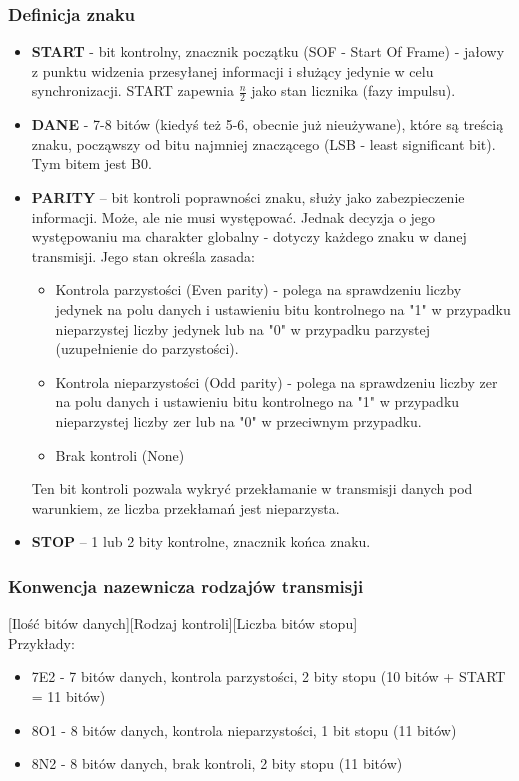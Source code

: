 		\subsubsection{Definicja znaku}
		\begin{itemize}
			\item \textbf{START} - bit kontrolny, znacznik początku (SOF - Start Of Frame) - jałowy z punktu widzenia przesyłanej informacji i służący jedynie w celu synchronizacji. START zapewnia $\frac{n}{2}$ jako stan licznika (fazy impulsu).
			\item \textbf{DANE} - 7-8 bitów (kiedyś też 5-6, obecnie już nieużywane), które są treścią znaku, począwszy od bitu najmniej znaczącego (LSB - least significant bit). Tym bitem jest B0.
			\item \textbf{PARITY} – bit kontroli poprawności znaku, służy jako zabezpieczenie informacji. Może, ale nie musi występować. Jednak decyzja o jego występowaniu ma charakter globalny - dotyczy każdego znaku w danej transmisji. Jego stan określa zasada:
			\begin{itemize}
				\item Kontrola parzystości (Even parity) - polega na sprawdzeniu liczby jedynek na polu danych i ustawieniu bitu kontrolnego na "1" w przypadku nieparzystej liczby jedynek lub na "0" w przypadku parzystej (uzupełnienie do parzystości).
				\item Kontrola nieparzystości (Odd parity) - polega na sprawdzeniu liczby zer na polu danych i ustawieniu bitu kontrolnego na "1" w przypadku nieparzystej liczby zer lub na "0" w przeciwnym przypadku.
				\item Brak kontroli (None)
			\end{itemize}
			Ten bit kontroli pozwala wykryć przekłamanie w transmisji danych pod warunkiem, ze liczba przekłamań jest nieparzysta.
			\item \textbf{STOP} – 1 lub 2 bity kontrolne, znacznik końca znaku.
		\end{itemize}
		\subsubsection{Konwencja nazewnicza rodzajów transmisji}
			[Ilość bitów danych][Rodzaj kontroli][Liczba bitów stopu]\\Przykłady:
			\begin{itemize}
				\item 7E2 - 7 bitów danych, kontrola parzystości, 2 bity stopu (10 bitów + START = 11 bitów)
				\item 8O1 - 8 bitów danych, kontrola nieparzystości, 1 bit stopu (11 bitów)
				\item 8N2 - 8 bitów danych, brak kontroli, 2 bity stopu (11 bitów)
			\end{itemize}
